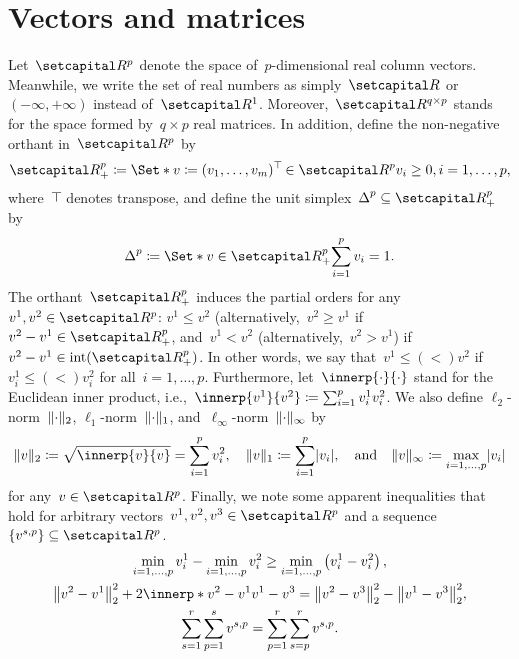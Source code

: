 \documentclass[../main]{subfiles}
\begin{document}
\section{Vectors and matrices}
Let~$\setR^p$ denote the space of~$p$-dimensional real column vectors.
Meanwhile, we write the set of real numbers as simply~$\setR$ or~$(- \infty, + \infty)$ instead of~$\setR^1$.
Moreover,~$\setR^{q \times p}$ stands for the space formed by~$q \times p$ real matrices.
In addition, define the non-negative orthant in~$\setR^p$ by
\begin{equation}
    \setRpos^p \coloneqq \Set*{v \coloneqq (v_1, \dots, v_m)^\T \in \setR^p}{v_i \ge 0, i = 1, \dots, p}
    ,\end{equation}
where~$\top\hspace{-1pt}$ denotes transpose, and define the unit simplex~$\simplex^p \subseteq \setRpos^p$ by
\begin{equation} \label{eq:simplex}
    \simplex^p \coloneqq \Set*{v \in \setRpos^p}{\sum_{i = 1}^{p} v_i = 1}
    .\end{equation}
The orthant~$\setRpos^p$ induces the partial orders for any~$v^1, v^2 \in \setR^p$: $v^1 \le v^2$ (alternatively,~$v^2 \ge v^1$ if~$v^2 - v^1 \in \setRpos^p$, and~$v^1 < v^2$ (alternatively,~$v^2 > v^1$) if~$v^2 - v^1 \in \interior(\setRpos^p)$.
In other words, we say that~$v^1 \mathrel{\le (<)} v^2$ if~$v^1_i \mathrel{\le (<)} v^2_i$ for all~$i = 1, \dots, p$.
Furthermore, let~$\innerp{\cdot}{\cdot}$ stand for the Euclidean inner product, i.e.,~$\innerp{v^1}{v^2} \coloneqq \sum_{i = 1}^{p} v^1_i v^2_i$.
We also define $\ell_2$-norm~$\lVert\cdot\rVert_2$, $\ell_1$-norm~$\lVert\cdot\rVert_1$, and~$\ell_\infty$-norm~$\lVert\cdot\rVert_\infty$ by
\begin{equation}
    \norm{v}_2 \coloneqq \sqrt{\innerp{v}{v}} = \sum_{i = 1}^{p} v_i^2, \quad \norm{v}_1 \coloneqq \sum_{i = 1}^{p} \abs{v_i}, \eqand \norm{v}_\infty \coloneqq \max_{i = 1, \dots, p} \abs{v_i}
\end{equation}
for any~$v \in \setR^p$.
Finally, we note some apparent inequalities that hold for arbitrary vectors~$v^1, v^2, v^3 \in \setR^p$ and a sequence~$\set{v^{s,p}} \subseteq \setR^p$.
\begin{gather}
    \min_{i = 1, \dots, p} v^1_i - \min_{i = 1, \dots, p} v^2_i \ge \min_{i = 1, \dots, p} \left( v^1_i - v^2_i \right) \label{eq:min_diff_ineq}, \\
    \norm*{v^2 - v^1}_2^2 + 2 \innerp*{v^2 - v^1}{v^1 - v^3} = \norm*{ v^2 - v^3 }_2^2 - \norm*{v^1 - v^3}_2^2 \label{eq:Pythagoras}, \\
    \sum_{s=1}^r \sum_{p=1}^s v^{s,p} = \sum_{p=1}^r \sum_{s=p}^r v^{s,p} \label{eq:change sum}
    .\end{gather}
\end{document}
